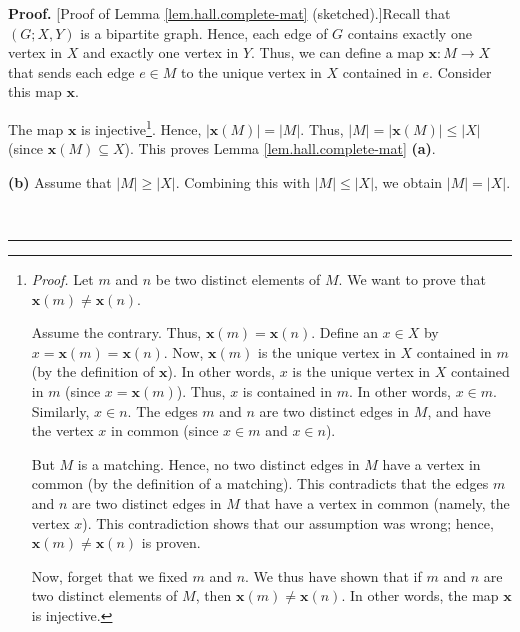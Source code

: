 \documentclass[numbers=enddot,12pt,final,onecolumn,notitlepage]{scrartcl}%
\theoremstyle{definition}
\newenvironment{proof}[1][Proof]{\noindent\textbf{#1.} }{\ \rule{0.5em}{0.5em}}
\begin{document}
\begin{proof}
[Proof of Lemma \ref{lem.hall.complete-mat} (sketched).]Recall that $\left(
G;X,Y\right)  $ is a bipartite graph. Hence, each edge of $G$ contains exactly
one vertex in $X$ and exactly one vertex in $Y$. Thus, we can define a map
$\mathbf{x}:M\rightarrow X$ that sends each edge $e\in M$ to the unique vertex
in $X$ contained in $e$. Consider this map $\mathbf{x}$.

The map $\mathbf{x}$ is injective\footnote{\textit{Proof.} Let $m$ and $n$ be
two distinct elements of $M$. We want to prove that $\mathbf{x}\left(
m\right)  \neq\mathbf{x}\left(  n\right)  $.
\par
Assume the contrary. Thus, $\mathbf{x}\left(  m\right)  =\mathbf{x}\left(
n\right)  $. Define an $x\in X$ by $x=\mathbf{x}\left(  m\right)
=\mathbf{x}\left(  n\right)  $. Now, $\mathbf{x}\left(  m\right)  $ is the
unique vertex in $X$ contained in $m$ (by the definition of $\mathbf{x}$). In
other words, $x$ is the unique vertex in $X$ contained in $m$ (since
$x=\mathbf{x}\left(  m\right)  $). Thus, $x$ is contained in $m$. In other
words, $x\in m$. Similarly, $x\in n$. The edges $m$ and $n$ are two distinct
edges in $M$, and have the vertex $x$ in common (since $x\in m$ and $x\in n$).
\par
But $M$ is a matching. Hence, no two distinct edges in $M$ have a vertex in
common (by the definition of a matching). This contradicts that the edges $m$
and $n$ are two distinct edges in $M$ that have a vertex in common (namely,
the vertex $x$). This contradiction shows that our assumption was wrong;
hence, $\mathbf{x}\left(  m\right)  \neq\mathbf{x}\left(  n\right)  $ is
proven.
\par
Now, forget that we fixed $m$ and $n$. We thus have shown that if $m$ and $n$
are two distinct elements of $M$, then $\mathbf{x}\left(  m\right)
\neq\mathbf{x}\left(  n\right)  $. In other words, the map $\mathbf{x}$ is
injective.}. Hence, $\left\vert \mathbf{x}\left(  M\right)  \right\vert
=\left\vert M\right\vert $. Thus, $\left\vert M\right\vert =\left\vert
\mathbf{x}\left(  M\right)  \right\vert \leq\left\vert X\right\vert $ (since
$\mathbf{x}\left(  M\right)  \subseteq X$). This proves Lemma
\ref{lem.hall.complete-mat} \textbf{(a)}.

\textbf{(b)} Assume that $\left\vert M\right\vert \geq\left\vert X\right\vert
$. Combining this with $\left\vert M\right\vert \leq\left\vert X\right\vert $,
we obtain $\left\vert M\right\vert =\left\vert X\right\vert $.


\end{proof}
\end{document}

